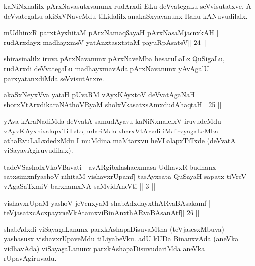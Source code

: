 \begin{artha}
kaNiNxnalilx pArxNavasutxvanunx rudArxdi ELu deVvategaLu seVvisutatxve. A deVvategaLu akiSxVNaveMdu tiLidalilx anakaSxyavanunx Itanu kANuvudilalx.
\end{artha}

\begin{shl}
mUdhinxR parxtAyxhitaM pArxNamaqSayaH pArxNasaMjacnxkAH |
rudArxdayx madhayxmeV yatAnxtasxtataM payuRpAsateV\hfill || 24 ||
\end{shl}

\begin{artha}
shirasinalilx iruva pArxNavanunx pArxNaveMba hesaruLaLx QuSigaLu, rudArxdi deVvategaLu madhayxmavAda pArxNavanunx yAvAgalU parxyatanxdiMda seVvisutAtxre.
\end{artha}

\begin{shl}
akaSxNeyxVva yataH pUvaRM vAyxKAyxtoV deVvatAgaNaH |
shorxVtArxdikaraNAthoVR\s yaM sholxVkasatxsAmxdudAhaqtaH\hfill || 25 ||
\end{shl}

\begin{artha}
yAva kAraNadiMda deVvatA samudAyavu kaNiNxnalelxV iruvudeMdu vAyxKAyxnisalapxTiTxto, adariMda shorxVtArxdi iMdirxyagaLeMba athaRvuLaLxdedxMdu I muMdina maMtarxvu heVLalapxTiTxde (deVvatA viSayavAgiruvudilalx).
\end{artha}




\begin{shl}
tadeVSasholxVkoVBavati - avARgibxlashacxmasa UdhavxR budhanx
satxsimxnfyashoV  nihitaM vishavxrUpamf| tasAyx\s\s sata QuSayaH
sapatx tiVreV vAgaSaTxmiV barxhamxNA saMvidAneVti || 3 ||
\end{shl}

\begin{shl}
vishavxrUpaM yashoV jeVcnxyaM shabAdxdayxthARvaBAsakamf |
teVjasatxcAcxpayxneVkAtamxviBinAnxthARvaBAsanAtf\hfill || 26 ||
\end{shl}

\begin{artha}
shabAdxdi viSayagaLanunx parxkAshapaDisuvaMtha (teVjasesxMbuva) yashasusx vishavxrUpaveMdu tiLiyabeVku. adU kUDa BinanxvAda (aneVka vidhavAda) viSayagaLanunx parxkAshapaDisuvudariMda aneVka rUpavAgiruvadu.
\end{artha}

